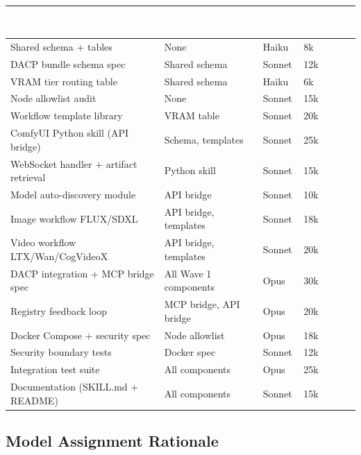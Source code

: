 \documentclass[11pt,letterpaper]{article}
\newcommand{\tableheader}[1]{\textbf{\sffamily\textcolor{white}{#1}}}
\begin{document}
\begin{center}
\begin{tabularx}{\textwidth}{L{3.5cm}L{3cm}L{1.8cm}C{1.5cm}}
\toprule
{}
\tableheader{Component} & \tableheader{Dependencies} & \tableheader{Model} & \tableheader{Est. Tokens} \\
\midrule
Shared schema + tables & None & Haiku & 8k \\
DACP bundle schema spec & Shared schema & Sonnet & 12k \\
VRAM tier routing table & Shared schema & Haiku & 6k \\
Node allowlist audit & None & Sonnet & 15k \\
Workflow template library & VRAM table & Sonnet & 20k \\
ComfyUI Python skill (API bridge) & Schema, templates & Sonnet & 25k \\
WebSocket handler + artifact retrieval & Python skill & Sonnet & 15k \\
Model auto-discovery module & API bridge & Sonnet & 10k \\
Image workflow FLUX/SDXL & API bridge, templates & Sonnet & 18k \\
Video workflow LTX/Wan/CogVideoX & API bridge, templates & Sonnet & 20k \\
DACP integration + MCP bridge spec & All Wave 1 components & Opus & 30k \\
Registry feedback loop & MCP bridge, API bridge & Opus & 20k \\
Docker Compose + security spec & Node allowlist & Opus & 18k \\
Security boundary tests & Docker spec & Sonnet & 12k \\
Integration test suite & All components & Opus & 25k \\
Documentation (SKILL.md + README) & All components & Sonnet & 15k \\
\bottomrule
\end{tabularx}
\end{center}

\subsection{Model Assignment Rationale}
\end{document}
